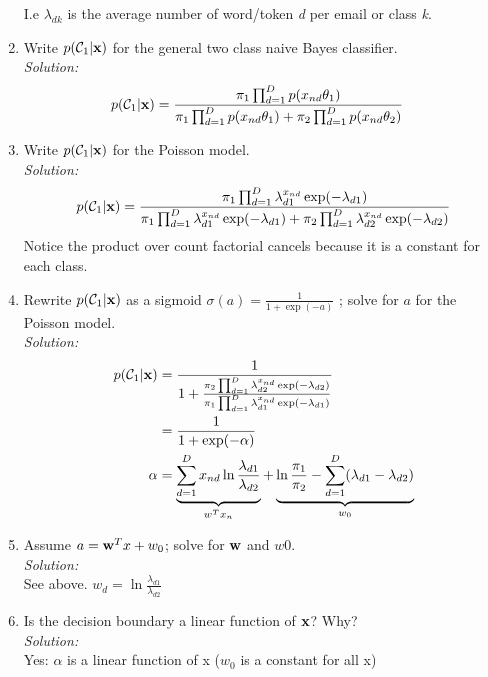\documentclass[12pt,a4paper]{article}
\newcommand{\xscalar}{x}
\newcommand{\xvec}{{\bf \xscalar}}
\newcommand{\wscalar}{w}
\newcommand{\wvec}{{\bf \wscalar}}
\newcommand{\class}{\mathcal{C}}
\newcommand{\sigmoid}{\sigma}
\begin{document}
\begin{enumerate}
		I.e $\lambda_{dk}$ is the average number of word/token \textit{d} per email or class \textit{k}.      
		
		\item Write $p(\class_{1} | \xvec)$ for the general two class naive Bayes classifier.\\
		\emph{Solution:} \\
		
		\begin{align*}
		p(\class_{1} | \xvec) &= \frac{\pi_1 \prod_{d = 1}^{D}p(x_{nd}\theta_1)}{\pi_1 \prod_{d = 1}^{D}p(x_{nd}\theta_1) + \pi_2 \prod_{d = 1}^{D}p(x_{nd}\theta_2)}
		\end{align*}
		
		\item Write $p(\class_{1} | \xvec)$ for the Poisson model. \\
		\emph{Solution:} \\
		
		\begin{align*}
		p(\class_{1} | \xvec) &= \frac{\pi_1 \prod_{d = 1}^{D} \lambda_{d1}^{x_{nd}} \exp(-\lambda_{d1})} {\pi_1 \prod_{d = 1}^{D}\lambda_{d1}^{x_{nd}} \exp(-\lambda_{d1}) + \pi_2 \prod_{d=1}^{D}\lambda_{d2}^{x_{nd}} \exp(-\lambda_{d2})}\\
		\end{align*}	
		Notice the product over count factorial cancels because it is a constant for each class.
		
		\item Rewrite $p(\class_{1} | \xvec)$ as a sigmoid $\sigmoid(a) = \frac{1}{1 + \exp(-a)}$ ; solve for $a$ for the Poisson model. \\
		\emph{Solution:} \\
		
		\begin{align*}
		p(\class_{1} | \xvec) &= \frac{1} {1 + \frac{\pi_2 \prod_{d=1}^{D}\lambda_{d2}^{x_{nd}} \exp(-\lambda_{d2})}{\pi_1 \prod_{d = 1}^{D}\lambda_{d1}^{x_{nd}} \exp(-\lambda_{d1})}} \\
		&= \frac{1}{1 + \exp(-\alpha)}\\
		\alpha &= \underbrace{\sum_{d=1}^{D} x_{nd} \ln\frac{\lambda_{d1}}{\lambda_{d2}}}_{w^{T} x_n}  + \underbrace{\ln \frac{\pi_1}{\pi_2} - \sum_{d=1}^{D}(\lambda_{d1} - \lambda_{d2})}_{w_0} \\
		\end{align*}
		
		\item Assume $a = \wvec^{T}x + w_{0}$; solve for $\wvec$ and $w0$. \\
		\emph{Solution:} \\
		
		See above. $w_d = \ln\frac{\lambda_{d1}}{\lambda_{d2}}$
		
		\item Is the decision boundary a linear function of $\xvec$? Why? \\
		\emph{Solution:} \\
		
		Yes: $\alpha$ is a linear function of x ($w_0$ is a constant for all x)
	\end{enumerate}
	
\end{document}
